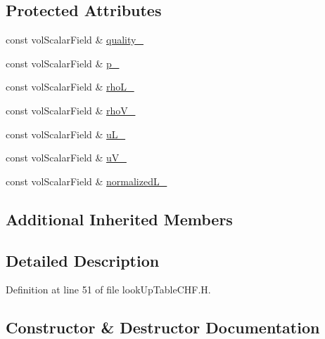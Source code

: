 \subsection*{Protected Attributes}
\begin{DoxyCompactItemize}
\item 
const vol\+Scalar\+Field \& \hyperlink{classFoam_1_1criticalHeatFluxModels_1_1lookUpTableCHF_a34013b1f6a75139d9177de031dd282c8}{quality\+\_\+}
\item 
const vol\+Scalar\+Field \& \hyperlink{classFoam_1_1criticalHeatFluxModels_1_1lookUpTableCHF_a4c9ce31e482786bbeeed352570fd8d09}{p\+\_\+}
\item 
const vol\+Scalar\+Field \& \hyperlink{classFoam_1_1criticalHeatFluxModels_1_1lookUpTableCHF_a479e08e6bcdde163c6265c7f22c21e36}{rho\+L\+\_\+}
\item 
const vol\+Scalar\+Field \& \hyperlink{classFoam_1_1criticalHeatFluxModels_1_1lookUpTableCHF_adb0e6ff43c296a0a74cccc998ebbf0ae}{rho\+V\+\_\+}
\item 
const vol\+Scalar\+Field \& \hyperlink{classFoam_1_1criticalHeatFluxModels_1_1lookUpTableCHF_abfc5ed5932db7281177705526dcdef13}{u\+L\+\_\+}
\item 
const vol\+Scalar\+Field \& \hyperlink{classFoam_1_1criticalHeatFluxModels_1_1lookUpTableCHF_a5fe01c2fa7069b1ca3b20f603ad349fb}{u\+V\+\_\+}
\item 
const vol\+Scalar\+Field \& \hyperlink{classFoam_1_1criticalHeatFluxModels_1_1lookUpTableCHF_a5e620c7dc0eee9db009e480d508a2814}{normalized\+L\+\_\+}
\end{DoxyCompactItemize}
\subsection*{Additional Inherited Members}


\subsection{Detailed Description}


Definition at line 51 of file look\+Up\+Table\+C\+H\+F.\+H.



\subsection{Constructor \& Destructor Documentation}
\mbox{\label{classFoam_1_1criticalHeatFluxModels_1_1lookUpTableCHF_a13dd134b2a0fdb76343d98aefba0c56a}} 
